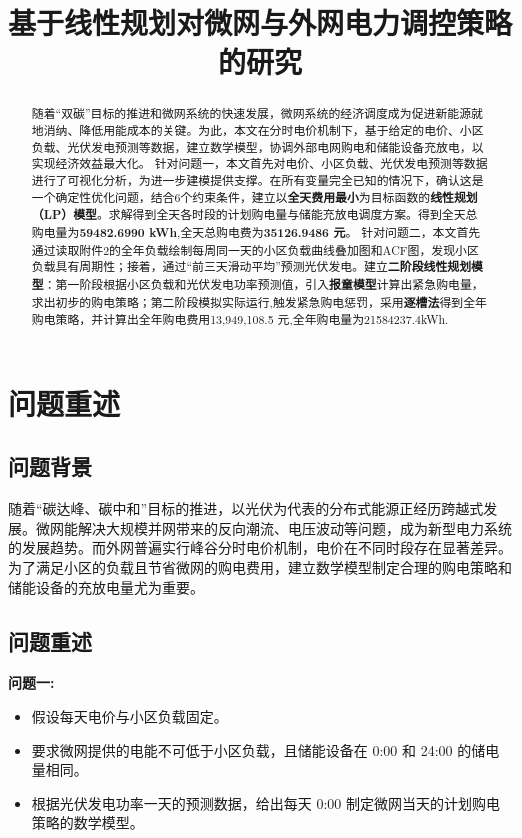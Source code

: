 \documentclass{cumcmthesis}
\title{基于线性规划对微网与外网电力调控策略的研究}
\begin{document}
\maketitle

\begin{abstract}
    随着“双碳”目标的推进和微网系统的快速发展，微网系统的经济调度成为促进新能源就地消纳、降低用能成本的关键。为此，本文在分时电价机制下，基于给定的电价、小区负载、光伏发电预测等数据，建立数学模型，协调外部电网购电和储能设备充放电，以实现经济效益最大化。\newline \hspace*{2em}
    针对问题一，本文首先对电价、小区负载、光伏发电预测等数据进行了可视化分析，为进一步建模提供支撑。在所有变量完全已知的情况下，确认这是一个确定性优化问题，结合6个约束条件，建立以\textbf{全天费用最小}为目标函数的\textbf{线性规划（LP）模型}。求解得到全天各时段的计划购电量与储能充放电调度方案。得到全天总购电量为\textbf{59482.6990 kWh},全天总购电费为\textbf{35126.9486 元}。\newline \hspace*{2em} 针对问题二，本文首先通过读取附件2的全年负载绘制每周同一天的小区负载曲线叠加图和ACF图，发现小区负载具有周期性；接着，通过“前三天滑动平均”预测光伏发电。建立\textbf{二阶段线性规划模型}：第一阶段根据小区负载和光伏发电功率预测值，引入\textbf{报童模型}计算出紧急购电量，求出初步的购电策略；第二阶段模拟实际运行,触发紧急购电惩罚，采用\textbf{逐槽法}得到全年购电策略，并计算出全年购电费用13,949,108.5 元,全年购电量为21584237.4kWh.
          
        \end{abstract}
        \section{问题重述}
        \subsection{问题背景}
       随着“碳达峰、碳中和”目标的推进，以光伏为代表的分布式能源正经历跨越式发展。微网能解决大规模并网带来的反向潮流、电压波动等问题，成为新型电力系统的发展趋势。而外网普遍实行峰谷分时电价机制，电价在不同时段存在显著差异。为了满足小区的负载且节省微网的购电费用，建立数学模型制定合理的购电策略和储能设备的充放电量尤为重要。
        \subsection{问题重述}
        \noindent\textbf{问题一:}
        \begin{itemize}
            \item 假设每天电价与小区负载固定。
            \item 要求微网提供的电能不可低于小区负载，且储能设备在 0:00 和 24:00 的储电量相同。
            \item 根据光伏发电功率一天的预测数据，给出每天 0:00 制定微网当天的计划购电策略的数学模型。
        \end{itemize}
        
\end{document}

